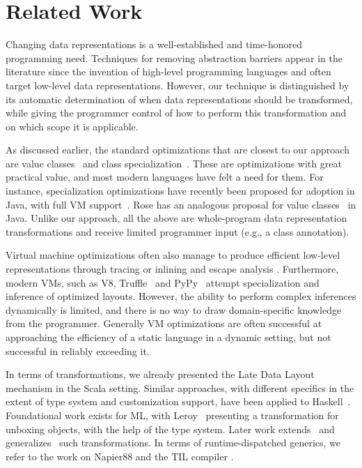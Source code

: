 \section{Related Work}
\label{sec:related}


Changing data representations is a well-established and time-honored
programming need. Techniques for removing abstraction barriers appear
in the literature since the invention of high-level programming
languages and often target low-level data representations. However,
our technique is distinguished by its automatic determination of when
data representations should be transformed, while giving the
programmer control of how to perform this transformation and on which
scope it is applicable. %

As discussed earlier, the standard optimizations that are closest to
our approach are value classes~\cite{sip-value-classes} and class
specialization~\cite{iuli-thesis,miniboxing}. These are optimizations
with great practical value, and most modern languages have felt a need
for them. For instance, specialization optimizations have recently
been proposed for adoption in Java, with full VM
support~\cite{goetz-specialization}. Rose has an analogous proposal
for value
classes~\cite{rose-value-classes-vm,rose-value-classes-tearing} in
Java. Unlike our approach, all the above are whole-program data
representation transformations and receive limited programmer input
(e.g., a class annotation).

Virtual machine optimizations often also manage to produce efficient
low-level representations through tracing \cite{tracemonkey} or
inlining and escape analysis
\cite{escape-analysis-first-paper,stadler-escape-analysis}. Furthermore,
modern VMs, such as V8,
Truffle~\cite{Wurthinger:2013:OVR:2509578.2509581} and
PyPy~\cite{PyPyTracing} attempt specialization and inference of
optimized layouts. However, the ability to perform complex inferences
dynamically is limited, and there is no way to draw domain-specific
knowledge from the programmer. Generally VM optimizations are often
successful at approaching the efficiency of a static language in a
dynamic setting, but not successful in reliably exceeding it.

In terms of transformations, we already presented the Late Data Layout \cite{ldl} mechanism in
the Scala setting. Similar approaches, with different specifics in the
extent of type system and customization support, have been applied to
Haskell~\cite{spj-unboxed-values}. Foundational work exists for ML,
with Leroy~\cite{leroy-unboxed-objects} presenting a transformation
for unboxing objects, with the help of the type system. Later work
extends~\cite{thiemann-unboxed-objects-cps} and
generalizes~\cite{shao-flexible-representation-analysis} such
transformations. In terms of runtime-dispatched
generics, we refer to the work on Napier88 \cite{morrison-napier88}
and the TIL compiler \cite{tarditi-til} \cite{harper-intensional-type-analysis}.

